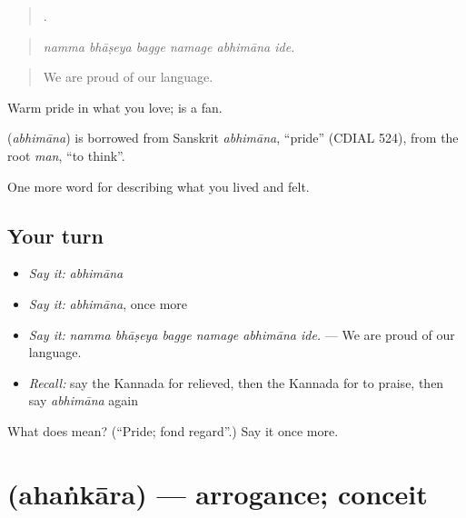\begin{quote}
     .
\end{quote}

\begin{quote}
\emph{namma bhāṣeya bagge namage abhimāna ide.}
\end{quote}

\begin{quote}
We are proud of our language.
\end{quote}

Warm pride in what you love;  is a fan.

\begin{cousinweb}
\textbf{} (\emph{abhimāna}) is borrowed from Sanskrit \emph{abhimāna}, \textquotedblleft{}pride\textquotedblright{} (CDIAL 524), from the root \emph{man}, \textquotedblleft{}to think\textquotedblright{}.
\end{cousinweb}

\begin{grammarlens}[title={What you've built}]
One more word for describing what you lived and felt.
\end{grammarlens}

\subsection*{Your turn}
\begin{itemize}
\raggedright
  \item \emph{Say it:} \emph{abhimāna}
  \item \emph{Say it:} \emph{abhimāna}, once more
  \item \emph{Say it:} \emph{namma bhāṣeya bagge namage abhimāna ide.} — We are proud of our language.
  \item \emph{Recall:} say the Kannada for relieved, then the Kannada for to praise, then say \emph{abhimāna} again
\end{itemize}

\begin{tcolorbox}[breakable,colback=teal!4,colframe=teal!35!black,title={Before you move on}]
What does  mean? (\textquotedblleft{}Pride; fond regard\textquotedblright{}.) Say it once more.
\end{tcolorbox}
\section[\texorpdfstring{\kn{ಅಹಂಕಾರ} (ahaṅkāra)}{ಅಹಂಕಾರ (ahaṅkāra)}]{ (ahaṅkāra) — arrogance; conceit}

